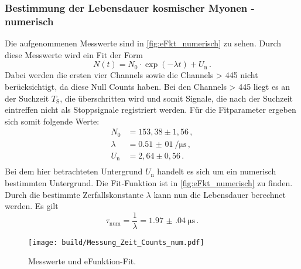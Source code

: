   \subsubsection{Bestimmung der Lebensdauer kosmischer Myonen - numerisch}
    Die aufgenommenen Messwerte sind in \autoref{fig:eFkt_numerisch} zu sehen.
    Durch diese Messwerte wird ein Fit der Form
    \begin{equation*}
      N(t) = N_0 \cdot \exp(-\lambda t) +U_\text{n} \, .
    \end{equation*}
    Dabei werden die ersten vier Channels sowie die Channels > 445 nicht berücksichtigt, da diese Null Counts haben.
    Bei den Channels > 445 liegt es an der Suchzeit $T_\text{S}$, die überschritten wird und somit Signale, die nach der Suchzeit eintreffen nicht als Stoppsignale registriert werden.
    Für die Fitparameter ergeben sich somit folgende Werte:
    \begin{align*}
      N_0 &= 153,38 \pm 1,56 \, ,\\
      \lambda &= \SI{0,51(01)}{\per\micro\second} \, ,\\
      U_\text{n} &= 2,64 \pm 0,56 \, . \\
    \end{align*}
    Bei dem hier betrachteten Untergrund $U_\text{n}$ handelt es sich um ein numerisch bestimmten Untergrund.
    Die Fit-Funktion ist in \autoref{fig:eFkt_numerisch} zu finden.
    Durch die bestimmte Zerfallskonstante $\lambda$ kann nun die Lebensdauer berechnet werden.
    Es gilt
    \begin{equation*}
      \tau_\text{num} = \frac{1}{\lambda} = \SI{1.97(04)}{\micro\second} \, .
    \end{equation*}
    \begin{figure}
      \centering
      \texttt{[image: build/Messung\_Zeit\_Counts\_num.pdf]}
      \caption{Messwerte und eFunktion-Fit.}
      \label{fig:eFkt_numerisch}
    \end{figure}

